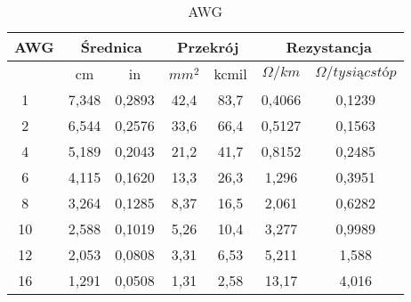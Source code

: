 \begin{table}[htbp!]
\begin{center}

    \begin{tabular}{|cc|c|c|c|c|c|c|}
        \hline
        \multicolumn{2}{c}{AWG}  &  \multicolumn{2}{c}{Średnica}  &  \multicolumn{2}{c}{Przekrój}  & \multicolumn{2}{c}{Rezystancja} \\
        \hline
         && cm & in & $mm^2$ & kcmil & $\Omega/km$ & $\Omega/tysiąc stóp$ \\
        \hline
        1 && 7,348 & 0,2893 & 42,4 & 83,7 & 0,4066 & 0,1239 \\
        \hline
        2 && 6,544 & 0,2576 & 33,6 & 66,4 & 0,5127 & 0,1563\\
        \hline
        4 && 5,189 & 0,2043 & 21,2 & 41,7 & 0,8152 & 0,2485\\
        \hline
        6 && 4,115 & 0,1620 & 13,3 & 26,3 & 1,296 & 0,3951\\
        \hline
        8 && 3,264 & 0,1285 & 8,37 & 16,5 & 2,061 & 0,6282\\
        \hline
        10 && 2,588 & 0,1019 & 5,26 & 10,4 & 3,277 & 0,9989\\
        \hline
        12 && 2,053 & 0,0808 & 3,31 & 6,53 & 5,211 & 1,588\\
        \hline
        16 && 1,291 & 0,0508 & 1,31 & 2,58 & 13,17 & 4,016\\
        \hline
    \end{tabular}
    \caption{AWG}
\end{center}  
\end{table}